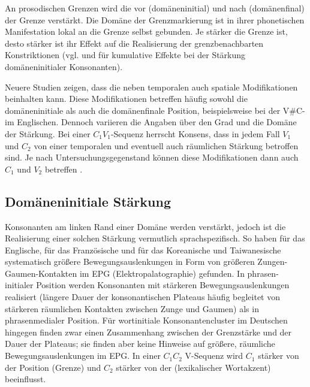 An prosodischen Grenzen wird die  vor (domäneninitial) und nach (domänenfinal) der Grenze verstärkt. Die Domäne der Grenzmarkierung ist in ihrer phonetischen Manifestation lokal an die Grenze selbst gebunden. Je stärker die Grenze ist, desto stärker ist ihr Effekt auf die Realisierung der grenzbenachbarten Konstriktionen (vgl. \citealt{Fougeron1997} und \citealt{Cho2009} für kumulative Effekte bei der Stärkung domäneninitialer Konsonanten).

Neuere Studien zeigen, dass die  neben temporalen auch spatiale Modifikationen beinhalten kann. Diese Modifikationen betreffen häufig sowohl die domäneninitiale als auch die domänenfinale Position, beispielsweise bei der V\#C- im Englischen. Dennoch variieren die Angaben über den Grad und die Domäne der Stärkung. Bei einer  ${C}_{1}{V}_{1}${}-Sequenz herrscht Konsens, dass in jedem Fall ${V}_{1}$ und ${C}_{2}$ von einer temporalen und eventuell auch räumlichen Stärkung betroffen sind. Je nach Untersuchungsgegenstand können diese Modifikationen dann auch ${C}_{1}$ und ${V}_{2}$ betreffen \citep[u.a.][]{Beckman1990,Edwards1991,Beckman1992,Fougeron1997,Fougeron2001,Byrd2003a,Tabain2003a,Tabain2003b,Cho2005a,Cho2006,Kuzla2007,Cho2009}.

\subsection{Domäneninitiale Stärkung}
\label{subsec:050201}

Konsonanten am linken Rand einer Domäne werden  verstärkt, jedoch ist die Realisierung einer solchen Stärkung vermutlich sprachspezifisch. So haben \citet{Fougeron1997} für das Englische, \citealt{Fougeron2001} für das Französische und \citet{Keating2004} für das Koreanische und Taiwanesische systematisch größere Bewegungsauslenkungen in Form von größeren Zungen-Gaumen-Kontakten im EPG (Elektropalatographie) gefunden. In phrasen-initialer Position werden Konsonanten mit stärkeren Bewegungsauslenkungen realisiert (längere Dauer der konsonantischen Plateaus häufig begleitet von stärkeren räumlichen Kontakten zwischen Zunge und Gaumen) als in phrasenmedialer Position. Für wortinitiale Konsonantencluster im Deutschen hingegen finden \citet{Bombien2010} zwar einen Zusammenhang zwischen der Grenzstärke und der Dauer der Plateaus; sie finden aber keine Hinweise auf größere, räumliche Bewegungsauslenkungen im EPG. In einer ${C}_{1}{C}_{2}$ V-Sequenz wird ${C}_{1}$ stärker von der Position (Grenze) und ${C}_{2}$ stärker von der  (lexikalischer Wortakzent) beeinflusst.

